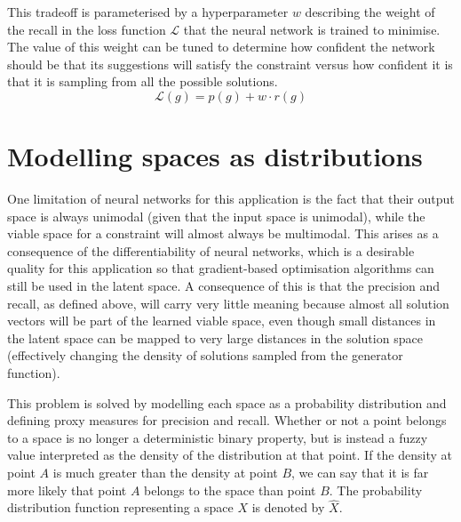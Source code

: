 \documentclass[../../main.tex]{subfiles}
\begin{document}
This tradeoff is parameterised by a hyperparameter $w$ describing the weight of the recall in the loss function $\mathcal{L}$ that the neural network is trained to minimise.
The value of this weight can be tuned to determine how confident the network should be that its suggestions will satisfy the constraint versus how confident it is that it is sampling from all the possible solutions.
$$\mathcal{L}(g) = p(g) + w \cdot r(g)$$

\section{Modelling spaces as distributions}

One limitation of neural networks for this application is the fact that their output space is always unimodal (given that the input space is unimodal), while the viable space for a constraint will almost always be multimodal.
This arises as a consequence of the differentiability of neural networks, which is a desirable quality for this application so that gradient-based optimisation algorithms can still be used in the latent space.
A consequence of this is that the precision and recall, as defined above, will carry very little meaning because almost all solution vectors will be part of the learned viable space, even though small distances in the latent space can be mapped to very large distances in the solution space (effectively changing the density of solutions sampled from the generator function).

This problem is solved by modelling each space as a probability distribution and defining proxy measures for precision and recall.
Whether or not a point belongs to a space is no longer a deterministic binary property, but is instead a fuzzy value interpreted as the density of the distribution at that point.
If the density at point $A$ is much greater than the density at point $B$, we can say that it is far more likely that point $A$ belongs to the space than point $B$.
The probability distribution function representing a space $X$ is denoted by $\hat{X}$.
\end{document}
